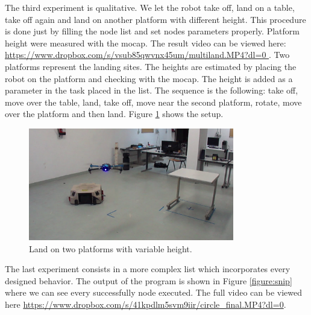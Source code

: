The third experiment is qualitative. We let the robot take off, land on a table, take off again and land on another platform with different height. This procedure is done just by filling the node list and set nodes parameters properly. Platform height were measured with the mocap. The result video can be viewed here: \url{https://www.dropbox.com/s/vsub85qwvnx45um/multiland.MP4?dl=0 }. Two platforms represent the landing sites. The heights are estimated by placing the robot on the platform and checking with the mocap. The height is added as a parameter in the task placed in the list. The sequence is the following: take off, move over the table, land, take off, move near the second platform, rotate, move over the platform and then land. Figure \ref{figure:multiland} shows the setup.

\begin{figure}[h]
\centering
 \includegraphics[width=0.8\textwidth]{multiland.png}
 \caption{Land on two platforms with variable height.}
 \label{figure:multiland}
\end{figure}

\noindent
The last experiment consists in a more complex list which incorporates every designed behavior. The output of the program is shown in Figure \ref{figure:snip} where we can see every successfully node executed. The full video can be viewed here \url{https://www.dropbox.com/s/41kpdlm5svm9iir/circle_final.MP4?dl=0}. 

